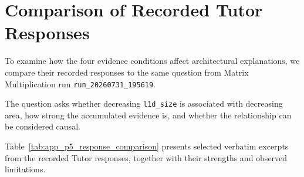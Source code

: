 \section{Comparison of Recorded Tutor Responses}
\label{app:p5_comparative_case_study}

To examine how the four evidence conditions
affect architectural explanations, we compare
their recorded responses to the same question
from Matrix Multiplication run
\texttt{run\_20260731\_195619}.

The question asks whether decreasing
\texttt{l1d\_size} is associated with
decreasing area, how strong the accumulated
evidence is, and whether the relationship
can be considered causal.

Table~\ref{tab:app_p5_response_comparison}
presents selected verbatim excerpts
from the recorded Tutor responses,
together with their strengths
and observed limitations.

